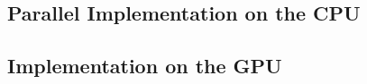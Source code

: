 \documentclass{stdlocal}
\begin{document}
\subsection{Parallel Implementation on the CPU} %
\label{sub:parallel_implementation_on_the_cpu}


\subsection{Implementation on the GPU} %
\label{sub:implementation_on_the_gpu}


\end{document}
